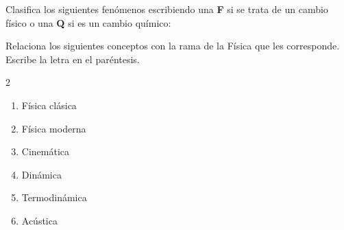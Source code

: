 \documentclass[addpoints, 12pt]{exam}
\begin{document}
\begin{questions}

\question Clasifica los siguientes fenómenos escribiendo una \textbf{F} si se trata de un cambio físico o una \textbf{Q} si es un cambio químico:

\question Relaciona los siguientes conceptos con la rama de la Física que les corresponde. Escribe la letra en el paréntesis.
\begin{multicols}{2}
    \begin{enumerate}
        \item[a)] Física clásica
        \item[b)] Física moderna
        \item[c)] Cinemática
        \item[d)] Dinámica
        \item[e)] Termodinámica
        \item[f)] Acústica
    \end{enumerate}
    \columnbreak
    \begin{parts}

\end{parts}
\end{multicols}
\end{questions}
\end{document}
